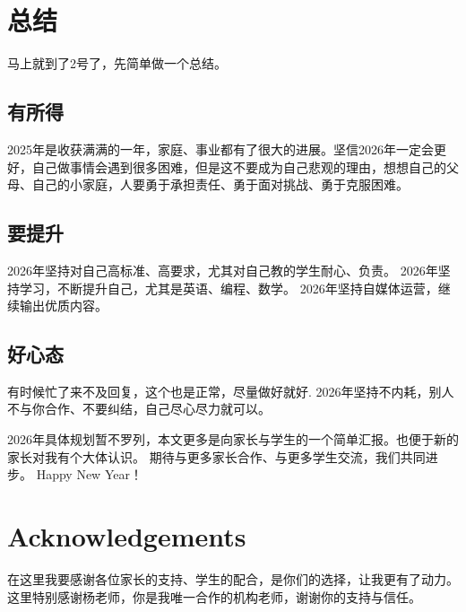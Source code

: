 \documentclass[11pt,a4paper]{article}
\begin{document}
\section{总结}
\label{sec:Ergebnisse}
马上就到了2号了，先简单做一个总结。
\subsection{有所得}
2025年是收获满满的一年，家庭、事业都有了很大的进展。坚信2026年一定会更好，自己做事情会遇到很多困难，但是这不要成为自己悲观的理由，想想自己的父母、自己的小家庭，人要勇于承担责任、勇于面对挑战、勇于克服困难。\newline
\subsection{要提升}
2026年坚持对自己高标准、高要求，尤其对自己教的学生耐心、负责。\newline
2026年坚持学习，不断提升自己，尤其是英语、编程、数学。\newline
2026年坚持自媒体运营，继续输出优质内容。\newline
\subsection{好心态}
有时候忙了来不及回复，这个也是正常，尽量做好就好.\newline
2026年坚持不内耗，别人不与你合作、不要纠结，自己尽心尽力就可以。\newline

2026年具体规划暂不罗列，本文更多是向家长与学生的一个简单汇报。也便于新的家长对我有个大体认识。\newline
期待与更多家长合作、与更多学生交流，我们共同进步。\newline
Happy New Year！
\section{Acknowledgements}
在这里我要感谢各位家长的支持、学生的配合，是你们的选择，让我更有了动力。\newline
这里特别感谢杨老师，你是我唯一合作的机构老师，谢谢你的支持与信任。
\end{document}
